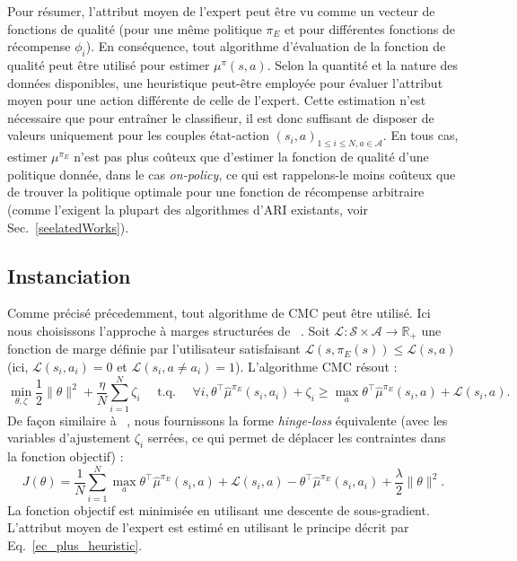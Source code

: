 \documentclass[french,utf8]{./hermes-journal}
\newcommand{\s}{\mathcal{S}}
\newcommand{\A}{\mathcal{A}}
\newcommand{\lc}{\mathcal{L}}
\begin{document}
Pour résumer, l'attribut moyen de l'expert peut être vu comme un vecteur de fonctions de qualité (pour une même politique  $\pi_E$ et pour différentes fonctions de récompense $\phi_i$). En conséquence, tout algorithme d'évaluation de la fonction de qualité peut être utilisé pour estimer $\mu^\pi(s,a)$.
Selon la quantité et la nature des données disponibles, une heuristique peut-être employée pour évaluer l'attribut moyen pour une action différente de celle de l'expert. Cette estimation n'est nécessaire que pour entraîner le classifieur, il est donc suffisant de disposer de valeurs uniquement pour les couples état-action $(s_i,a)_{1\leq i \leq N,a\in \A}$.
En tous cas, estimer  $\mu^{\pi_E}$ n'est pas plus coûteux que d'estimer la fonction de qualité d'une politique donnée, dans le cas \emph{on-policy}, ce qui est rappelons-le moins coûteux que de trouver la politique optimale pour une fonction de récompense arbitraire (comme l'exigent la plupart des algorithmes d'ARI existants, voir Sec.~\ref{seelatedWorks}).


\subsection{Instanciation}
\label{subseracticalApproacnstantiation}

Comme précisé précedemment, tout algorithme de CMC peut être utilisé. Ici nous choisissons l'approche à marges structurées de ~\cite{Taska005}. Soit
$\lc:\s\times\A\rightarrow\mathbb{R}_+$ une fonction de marge définie par l'utilisateur satisfaisant $\lc(s,\pi_E(s))\leq \lc(s,a)$ (ici,
$\lc(s_i,a_i)=0$ et $\lc(s_i,a\neq a_i)=1$). L'algorithme CMC résout :%
\begin{equation}
  \min_{\theta,\zeta}\frac{1}{2}\|\theta\|^2 +
  \frac{\eta}{N}\sum_{i=1}^N \zeta_i \text{~~~~t.q.~~~~} \forall i,
  \theta^\top\hat{\mu}^{\pi_E}(s_i,a_i)+\zeta_i \geq \max_a \theta^\top
  \hat{\mu}^{\pi_E}(s_i,a) + \lc(s_i,a). \label{ep_taskar}
\end{equation}
De façon similaire à ~\cite{Ratlif006}, nous fournissons la forme \emph{hinge-loss} équivalente (avec les variables d'ajustement $\zeta_i$ serrées, ce qui permet de déplacer les contraintes dans la fonction objectif) :
\begin{equation}
  J(\theta) = \frac{1}{N}\sum_{i=1}^N \max_a \theta^\top
  \hat{\mu}^{\pi_E}(s_i,a) + \lc(s_i,a) -
  \theta^\top\hat{\mu}^{\pi_E}(s_i,a_i) +
  \frac{\lambda}{2}\|\theta\|^2.
\end{equation}
La fonction objectif est minimisée en utilisant une descente de sous-gradient. L'attribut moyen de l'expert est estimé en utilisant le principe décrit par Eq.~\eqref{ec_plus_heuristic}.
\end{document}
